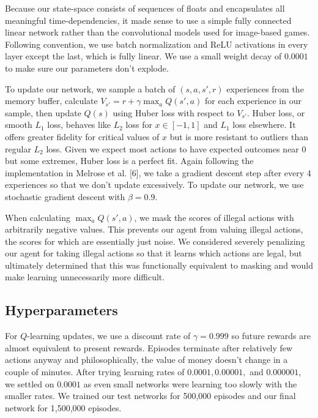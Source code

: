 \documentclass{article}
\begin{document}
Because our state-space consists of sequences of floats and encapsulates all meaningful time-dependencies, it made sense to use a simple fully connected linear network rather than the convolutional models used for image-based games. Following convention, we use batch normalization and ReLU activations in every layer except the last, which is fully linear. We use a small weight decay of $0.0001$ to make sure our parameters don't explode. 

To update our network, we sample a batch of $(s, a, s', r)$ experiences from the memory buffer, calculate $V_{s'} = r + \gamma \max_{a} Q(s', a)$ for each experience in our sample, then update $Q(s)$ using Huber loss with respect to $V_{s'}$. Huber loss, or smooth $L_1$ loss, behaves like $L_2$ loss for $x \in [-1,1]$ and $L_1$ loss elsewhere. It offers greater fidelity for critical values of $x$ but is more resistant to outliers than regular $L_2$ loss. Given we expect most actions to have expected outcomes near $0$ but some extremes, Huber loss is a perfect fit. Again following the implementation in Melrose et al. [6], we take a gradient descent step after every 4 experiences so that we don't update excessively. To update our network, we use stochastic gradient descent with $\beta = 0.9$. 

When calculating $\max_{a} Q(s', a)$, we mask the scores of illegal actions with arbitrarily negative values. This prevents our agent from valuing illegal actions, the scores for which are essentially just noise. We considered severely penalizing our agent for taking illegal actions so that it learns which actions are legal, but ultimately determined that this was functionally equivalent to masking and would make learning unnecessarily more difficult. 

\subsection{Hyperparameters}

For $Q$-learning updates, we use a discount rate of $\gamma = 0.999$ so future rewards are almost equivalent to present rewards. Episodes terminate after relatively few actions anyway and philosophically, the value of money doesn't change in a couple of minutes. After trying learning rates of $0.0001, 0.00001,$ and $0.000001$, we settled on $0.0001$ as even small networks were learning too slowly with the smaller rates. We trained our test networks for 500,000 episodes and our final network for 1,500,000 episodes. 
\end{document}
